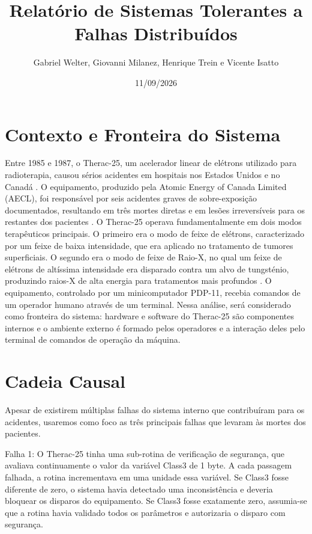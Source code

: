 \documentclass[12pt,a4paper]{article}
\title{Relatório de Sistemas Tolerantes a Falhas Distribuídos}
\author{Gabriel Welter, Giovanni Milanez, Henrique Trein e Vicente Isatto}
\date{11/09/2026}
\begin{document}
\maketitle

\section*{Contexto e Fronteira do Sistema}

Entre 1985 e 1987, o Therac-25, um acelerador linear de elétrons utilizado para radioterapia, causou sérios acidentes em hospitais nos Estados Unidos e no Canadá \cite{wiki_therac}. O equipamento, produzido pela Atomic Energy of Canada Limited (AECL), foi responsável por seis acidentes graves de sobre-exposição documentados, resultando em três mortes diretas e em lesões irreversíveis para os restantes dos pacientes \cite{sutori_summary}. O Therac-25 operava fundamentalmente em dois modos terapêuticos principais. O primeiro era o modo de feixe de elétrons, caracterizado por um feixe de baixa intensidade, que era aplicado no tratamento de tumores superficiais. O segundo era o modo de feixe de Raio-X, no qual um feixe de elétrons de altíssima intensidade era disparado contra um alvo de tungsténio, produzindo raios-X de alta energia para tratamentos mais profundos \cite{wiki_therac}. O equipamento, controlado por um minicomputador PDP-11, recebia comandos de um operador humano através de um terminal. Nessa análise, será considerado como fronteira do sistema: hardware e software do Therac-25 são componentes internos e o ambiente externo é formado pelos operadores e a interação deles pelo terminal de comandos de operação da máquina.

\section*{Cadeia Causal}
Apesar de existirem múltiplas falhas do sistema interno que contribuíram para os acidentes, usaremos como foco as três principais falhas que levaram às mortes dos pacientes.

Falha 1:
O Therac-25 tinha uma sub-rotina de verificação de segurança, que avaliava continuamente o valor da variável Class3 de 1 byte. A cada passagem falhada, a rotina incrementava em uma unidade essa variável. Se Class3 fosse diferente de zero, o sistema havia detectado uma inconsistência e deveria bloquear os disparos do equipamento. Se Class3 fosse exatamente zero, assumia-se que a rotina havia validado todos os parâmetros e autorizaria o disparo com segurança.
\end{document}
